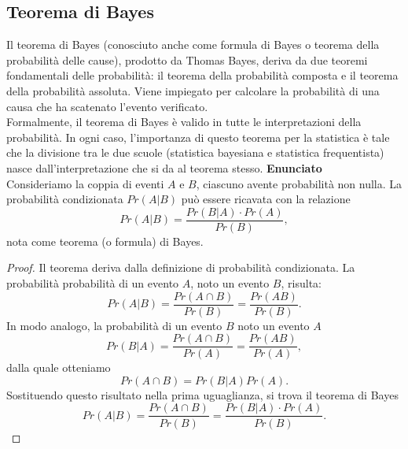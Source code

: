 \documentclass[12pt,oneside,openany]{memoir}
\numberwithin{equation}{subsection}
\begin{document}
\subsection{Teorema di Bayes}
Il teorema di Bayes (conosciuto anche come formula di Bayes o teorema della
probabilit\`a delle cause), prodotto da Thomas Bayes, deriva da due teoremi
fondamentali delle probabilit\`a: il teorema della probabilit\`a composta e il
teorema della probabilit\`a assoluta. Viene impiegato per calcolare la
probabilit\`a di una causa che ha scatenato l'evento verificato.\\
Formalmente, il teorema di Bayes \`e valido in tutte le interpretazioni della
probabilit\`a. In ogni caso, l'importanza di questo teorema per la statistica
\`e tale che la divisione tra le due scuole (statistica bayesiana e statistica
frequentista) nasce dall'interpretazione che si da al teorema stesso.
\bigbreak\noindent
\textbf{Enunciato}\\
Consideriamo la coppia di eventi $A$ e $B$, ciascuno avente probabilit\`a non
nulla. La probabilit\`a condizionata $Pr(A | B)$ pu\`o essere ricavata con la
relazione
\begin{equation}
    Pr(A | B) = \frac{Pr(B | A) \cdot Pr(A)}{Pr(B)},
\end{equation}
nota come teorema (o formula) di Bayes.
\begin{proof}
Il teorema deriva dalla definizione di probabilit\`a condizionata. La
probabilit\`a probabilit\`a di un evento $A$, noto un evento $B$, risulta:
\[
    Pr(A | B) = \frac{Pr(A \cap B)}{Pr(B)} = \frac{Pr(AB)}{Pr(B)}.
\]
In modo analogo, la probabilit\`a di un evento $B$ noto un evento $A$
\[
    Pr(B | A) = \frac{Pr(A \cap B)}{Pr(A)} = \frac{Pr(AB)}{Pr(A)},
\]
dalla quale otteniamo
\[
    Pr(A \cap B) = Pr(B | A) Pr(A).
\]
Sostituendo questo risultato nella prima uguaglianza, si trova il teorema di
Bayes
\[
    Pr(A | B) = \frac{Pr(A \cap B)}{Pr(B)} = \frac{Pr(B | A) \cdot
    Pr(A)}{Pr(B)}.
\]
\end{proof}

\end{document}
